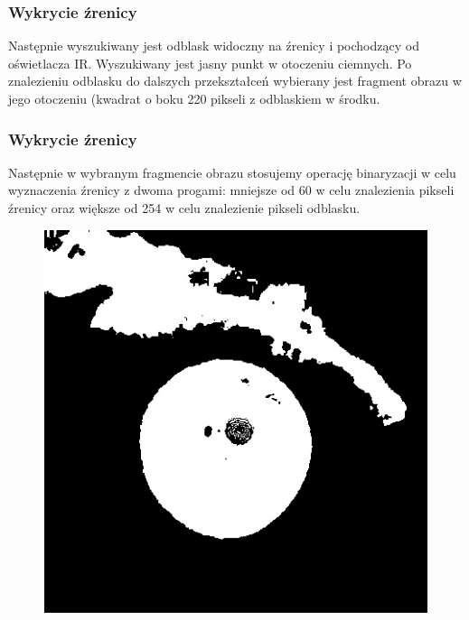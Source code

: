 \documentclass{beamer}
\begin{document}

\begin{frame}
\frametitle{Wykrycie źrenicy}
Następnie wyszukiwany jest odblask widoczny na źrenicy i pochodzący od oświetlacza IR. Wyszukiwany jest jasny punkt w otoczeniu ciemnych. Po znalezieniu odblasku do dalszych przekształceń wybierany jest fragment obrazu w jego otoczeniu (kwadrat o boku 220 pikseli z odblaskiem w środku.
\end{frame}


\begin{frame}
\frametitle{Wykrycie źrenicy}
Następnie w wybranym fragmencie obrazu stosujemy operację binaryzacji w celu wyznaczenia źrenicy z dwoma progami: mniejsze od 60 w celu znalezienia pikseli źrenicy oraz większe od 254 w celu znalezienie pikseli odblasku.
\begin{figure}
\begin{center}
\includegraphics[scale=0.25]{bin.jpg}
\end{center}
\end{figure}
\end{frame}

\end{document}
